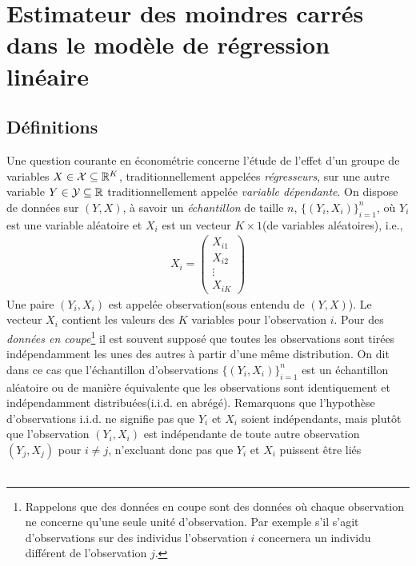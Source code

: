 \newpage

\tableofcontents

\newpage




\section{Estimateur des moindres carrés dans le modèle de régression linéaire}
\subsection{Définitions}
Une question courante en économétrie concerne l'étude de l'effet d'un groupe de variables $X \in \mathcal{X}\subseteq \mathbb{R}^K$, traditionnellement appelées \emph{régresseurs}, sur une autre variable $Y\in \mathcal{Y}\subseteq\mathbb{R}$ traditionnellement  appelée \emph{variable dépendante}.  
On dispose de données  sur $(Y, X)$, à savoir un \emph{échantillon} de taille $n$,  $\{(Y_i, X_i)\}_{i=1}^n$, où $Y_i$ est une variable aléatoire et $X_i$ est un vecteur $K\times 1$(de variables aléatoires), i.e.,
\begin{align*}
X_i = 
\begin{pmatrix}
X_{i1}\\
X_{i2}\\
\vdots\\
X_{iK}	
\end{pmatrix}
\end{align*}
Une paire $(Y_i, X_i)$ est appelée observation(sous entendu de $(Y, X)$). Le vecteur $X_i$ contient les valeurs des $K$ variables pour l'observation $i$.
Pour des \emph{données en coupe}\footnote{Rappelons que des données en coupe sont des données où chaque observation ne concerne qu'une seule unité d'observation. Par exemple s'il s'agit d'observations sur des individus l'observation $i$ concernera un individu différent de l'observation $j$.} il est souvent supposé que toutes les observations sont tirées indépendamment les unes des autres à partir d'une même distribution. On dit dans ce cas que l'échantillon d'observations $\{(Y_i, X_i)\}_{i=1}^n$ est un échantillon aléatoire ou de manière équivalente que les observations sont identiquement et indépendamment distribuées(i.i.d. en abrégé). Remarquons que l'hypothèse d'observations i.i.d. ne signifie pas que $Y_i$ et $X_i$ soient indépendants, mais plutôt que l'observation $(Y_i, X_i)$ est indépendante de toute autre observation $(Y_j, X_j)$ pour $i\neq j$, n'excluant donc pas que $Y_i$ et $X_i$ puissent être liés\\\
